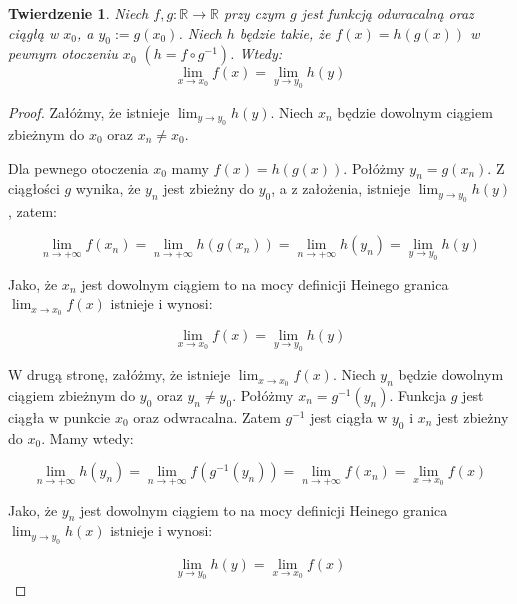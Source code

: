 \documentclass{article}
\newtheorem*{theorem}{Twierdzenie}
\begin{document}
\begin{theorem}
    Niech \(f, g : \mathbb{R} \to \mathbb{R}\) przy czym \(g\) jest funkcją odwracalną oraz ciągłą w \(x_0\), a \(y_0 := g(x_0)\).
    Niech \(h\) będzie takie, że \(f(x) = h(g(x))\) w pewnym otoczeniu \(x_0\) \((h = f \circ g^{-1})\).
    Wtedy:
    \begin{equation*}
        \lim_{x \to x_0} f(x) = \lim_{y \to y_0} h(y)
    \end{equation*}
\end{theorem}

\begin{proof}
Załóżmy, że istnieje \(\lim_{y \to y_0} h(y)\). Niech \(x_n\) będzie dowolnym ciągiem zbieżnym do \(x_0\) oraz \(x_n \neq x_0\).

Dla pewnego otoczenia \(x_0\) mamy \(f(x) = h(g(x))\). Połóżmy \(y_n = g(x_n)\). Z ciągłości \(g\) wynika, że \(y_n\) jest zbieżny do \(y_0\),
a z założenia, istnieje \(\lim_{y \to y_0} h(y)\), zatem: 

\begin{equation*}
    \lim_{n \to + \infty} f(x_n) = \lim_{n \to + \infty} h(g(x_n)) = \lim_{n \to + \infty} h(y_n) = \lim_{y \to y_0} h(y)
\end{equation*}

Jako, że \(x_n\) jest dowolnym ciągiem to na mocy definicji Heinego granica \(\lim_{x \to x_0} f(x)\) istnieje i wynosi:

\begin{equation*}
    \lim_{x \to x_0} f(x) = \lim_{y \to y_0} h(y)
\end{equation*}


W drugą stronę, załóżmy, że istnieje \(\lim_{x \to x_0} f(x)\). Niech \(y_n\) będzie dowolnym ciągiem zbieżnym do \(y_0\) oraz \(y_n \neq y_0\).
Połóżmy \(x_n = g^{-1}(y_n)\). Funkcja \(g\) jest ciągła w punkcie \(x_0\) oraz odwracalna. Zatem \(g^{-1}\) jest ciągła w \(y_0\) i \(x_n\) jest zbieżny do \(x_0\). 
Mamy wtedy:

\begin{equation*}
    \lim_{n \to + \infty} h(y_n) =  \lim_{n \to + \infty} f(g^{-1}(y_n)) = \lim_{n \to + \infty} f(x_n) = \lim_{x \to x_0} f(x) 
\end{equation*}

Jako, że \(y_n\) jest dowolnym ciągiem to na mocy definicji Heinego granica \(\lim_{y \to y_0} h(x)\) istnieje i wynosi:

\begin{equation*}
    \lim_{y \to y_0} h(y) = \lim_{x \to x_0} f(x)
\end{equation*}

\end{proof}
\end{document}
